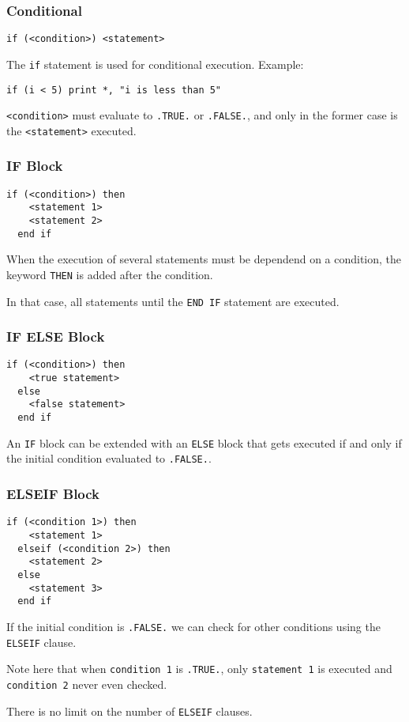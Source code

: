 \begin{frame}[fragile]
  \frametitle{Conditional}

  \begin{lstlisting}[numbers=none]
  if (<condition>) <statement>
  \end{lstlisting}
  The \texttt{if} statement is used for conditional execution.
  Example:
  \begin{lstlisting}[numbers=none]
  if (i < 5) print *, "i is less than 5"
  \end{lstlisting}

  \texttt{<condition>} must evaluate to \texttt{.TRUE.} or \texttt{.FALSE.}, and only in the former case is the \texttt{<statement>} executed.

\end{frame}

\begin{frame}[fragile]
  \frametitle{IF Block}

  \begin{lstlisting}[numbers=none]
  if (<condition>) then
    <statement 1>
    <statement 2>
  end if
  \end{lstlisting}

  When the execution of several statements must be dependend on
  a condition, the keyword \texttt{THEN} is added after the condition.

  In that case, all statements until the \texttt{END IF} statement are
  executed.

\end{frame}

\begin{frame}[fragile]
  \frametitle{IF ELSE Block}

  \begin{lstlisting}[numbers=none]
  if (<condition>) then
    <true statement>
  else
    <false statement>
  end if
  \end{lstlisting}

  An \texttt{IF} block can be extended with an \texttt{ELSE} block that
  gets executed if and only if the initial condition evaluated to \texttt{.FALSE.}.

\end{frame}

\begin{frame}[fragile]
  \frametitle{ELSEIF Block}

  \begin{lstlisting}[numbers=none]
  if (<condition 1>) then
    <statement 1>
  elseif (<condition 2>) then
    <statement 2>
  else
    <statement 3>
  end if
  \end{lstlisting}

  If the initial condition is \texttt{.FALSE.} we can check for other conditions
  using the \texttt{ELSEIF} clause. 

  Note here that when \texttt{condition 1} is \texttt{.TRUE.}, only 
  \texttt{statement 1} is executed and \texttt{condition 2} never even checked.

  There is no limit on the number of \texttt{ELSEIF} clauses.

\end{frame}

